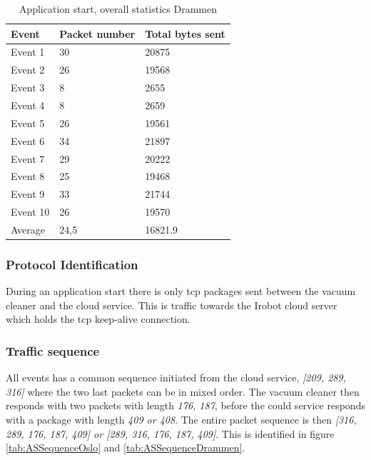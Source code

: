 \begin{table}[H]
\centering
\caption{Application start, overall statistics Drammen}
\label{tab:ASoverallDRA}
\begin{tabular}{|l|l|l|}
\hline
\textbf{Event} & \textbf{Packet number} & \textbf{Total bytes sent} \\ \hline
Event 1        & 30                     & 20875                     \\ \hline
Event 2        & 26                     & 19568                     \\ \hline
Event 3        & 8                      & 2655                      \\ \hline
Event 4        & 8                      & 2659                      \\ \hline
Event 5        & 26                     & 19561                     \\ \hline
Event 6        & 34                     & 21897                     \\ \hline
Event 7        & 29                     & 20222                     \\ \hline
Event 8        & 25                     & 19468                     \\ \hline
Event 9        & 33                     & 21744                     \\ \hline
Event 10       & 26                     & 19570                     \\ \hline
Average        & 24,5                   & 16821.9                   \\ \hline
\end{tabular}
\end{table}

\subsubsection{Protocol Identification}
During an application start there is only tcp packages sent between the vacuum cleaner and the cloud service. This is traffic towards the Irobot cloud server which holds the tcp keep-alive connection. 
\subsubsection{Traffic sequence}
All events has a common sequence initiated from the cloud service, \textit{[209, 289, 316]} where the two last packets can be in mixed order. The vacuum cleaner then responds with two packets with length \textit{176, 187}, before the could service responds with a package with length \textit{409 or 408}. The entire packet sequence is then \textit{[316, 289, 176, 187, 409] or [289, 316, 176, 187, 409]}. This is identified in figure \ref{tab:ASSequenceOslo} and \ref{tab:ASSequenceDrammen}.

